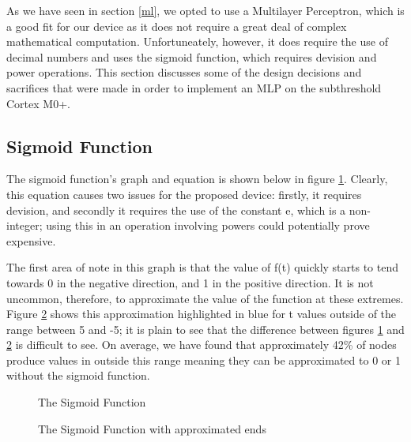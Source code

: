 
As we have seen in section \ref{ml}, we opted to use a Multilayer Perceptron, which is a good fit for our device as it does not require a great deal of complex mathematical computation. Unfortuneately, however, it does require the use of decimal numbers and uses the sigmoid function, which requires devision and power operations. This section discusses some of the design decisions and sacrifices that were made in order to implement an MLP on the subthreshold Cortex M0+.

\subsection{Sigmoid Function}
The sigmoid function's graph and equation is shown below in figure \ref{fig:sigmoid}. Clearly, this equation causes two issues for the proposed device: firstly, it requires devision, and secondly it requires the use of the constant e, which is a non-integer; using this in an operation involving powers could potentially prove expensive.

The first area of note in this graph is that the value of f(t) quickly starts to tend towards 0 in the negative direction, and 1 in the positive direction. It is not uncommon, therefore, to approximate the value of the function at these extremes. Figure \ref{fig:sigmoid_ends} shows this approximation highlighted in blue for t values outside of the range between 5 and -5; it is plain to see that the difference between figures \ref{fig:sigmoid} and \ref{fig:sigmoid_ends} is difficult to see. On average, we have found that approximately 42\%  of nodes produce values in outside this range meaning they can be approximated to 0 or 1 without the sigmoid function.

\begin{figure}
\centering
{}
\caption{The Sigmoid Function}
\label{fig:sigmoid}
\end{figure}

\begin{figure}
\centering
{}
\caption{The Sigmoid Function with approximated ends}
\label{fig:sigmoid_ends}
\end{figure}

